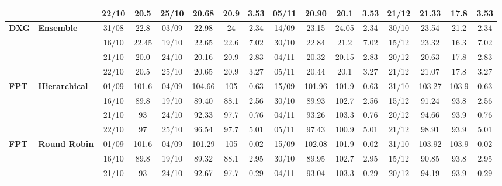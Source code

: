 \documentclass{ieeeaccess}
\begin{document}
\begin{table}[!h]
\begin{tabular}{llcc|cccc|cccc|cccc}
&
& 22/10 & 20.5 & 25/10 & 20.68 & 20.9 & 3.53 & 05/11 & 20.90 & 20.1 & 3.53 & 21/12 & 21.33 & 17.8 & 3.53 \\
\midrule


\multirow{4}{*}{\textbf{DXG}} 
& \textbf{Ensemble}
& 31/08 & 22.8 & 03/09 & 22.98 & 24 & 2.34 & 14/09 & 23.15 & 24.05 & 2.34 & 30/10 & 23.54 & 21.2 & 2.34 \\

&
& 16/10 & 22.45 & 19/10 & 22.65 & 22.6 & 7.02 & 30/10 & 22.84 & 21.2 & 7.02 & 15/12 & 23.32 & 16.3 & 7.02 \\

&
& 21/10 & 20.0 & 24/10 & 20.16 & 20.9 & 2.83 & 04/11 & 20.32 & 20.15 & 2.83 & 20/12 & 20.63 & 17.8 & 2.83 \\

&
& 22/10 & 20.5 & 25/10 & 20.65 & 20.9 & 3.27 & 05/11 & 20.44 & 20.1 & 3.27 & 21/12 & 21.07 & 17.8 & 3.27 \\
\midrule



\multirow{4}{*}{\textbf{FPT}} 
& \textbf{Hierarchical}
& 01/09 & 101.6 & 04/09 & 104.66 & 105 & 0.63 & 15/09 & 101.96 & 101.9 & 0.63 & 31/10 & 103.27 & 103.9 & 0.63 \\

&
& 16/10 & 89.8 & 19/10 & 89.40 & 88.1 & 2.56 & 30/10 & 89.93 & 102.7 & 2.56 & 15/12 & 91.24 & 93.8 & 2.56 \\

&
& 21/10 & 93 & 24/10 & 92.33 & 97.7 & 0.76 & 04/11 & 93.26 & 103.3 & 0.76 & 20/12 & 94.66 & 93.9 &0.76\\

&
& 22/10 & 97 & 25/10 & 96.54 & 97.7 & 5.01 & 05/11 & 97.43 & 100.9 & 5.01 & 21/12 & 98.91 & 93.9 & 5.01 \\
\midrule


\multirow{4}{*}{\textbf{FPT}} 
& \textbf{Round Robin}
& 01/09 & 101.6 & 04/09 & 101.29 & 105 & 0.02 & 15/09 & 102.08 & 101.9 & 0.02 & 31/10 & 103.92 & 103.9 & 0.02 \\

&
& 16/10 & 89.8 & 19/10 & 89.32 & 88.1 & 2.95 & 30/10 & 89.95 & 102.7 & 2.95 & 15/12 & 90.85 & 93.8 & 2.95 \\

&
& 21/10 & 93 & 24/10 & 92.67 & 97.7 & 0.29 & 04/11 & 93.04 & 103.3 & 0.29 & 20/12 & 94.19 & 93.9 & 0.29 \\


\end{tabular}
\end{table}
\end{document}
